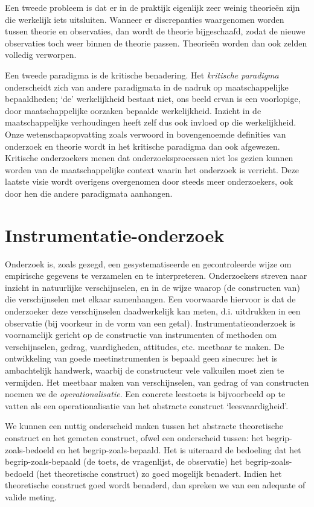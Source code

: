 \documentclass[
]{book}
\begin{document}
Een tweede probleem is dat er in de praktijk eigenlijk zeer weinig
theorieën zijn die werkelijk iets uitsluiten. Wanneer er discrepanties
waargenomen worden tussen theorie en observaties, dan wordt de theorie
bijgeschaafd, zodat de nieuwe observaties toch weer binnen de theorie
passen. Theorieën worden dan ook zelden volledig verworpen.

Een tweede paradigma is de kritische benadering. Het \emph{kritische paradigma}
onderscheidt zich van andere paradigmata in de nadruk op
maatschappelijke bepaaldheden; `de' werkelijkheid bestaat niet, ons
beeld ervan is een voorlopige, door maatschappelijke oorzaken bepaalde
werkelijkheid. Inzicht in de maatschappelijke verhoudingen heeft zelf
dus ook invloed op die werkelijkheid. Onze wetenschapsopvatting zoals
verwoord in bovengenoemde definities van onderzoek en theorie wordt in
het kritische paradigma dan ook afgewezen. Kritische onderzoekers menen
dat onderzoeksprocessen niet los gezien kunnen worden van de
maatschappelijke context waarin het onderzoek is verricht. Deze laatste
visie wordt overigens overgenomen door steeds meer onderzoekers, ook
door hen die andere paradigmata aanhangen.

\hypertarget{sec:instrumentatie-onderzoek}{%
\section{Instrumentatie-onderzoek}\label{sec:instrumentatie-onderzoek}}

Onderzoek is, zoals gezegd, een gesystematiseerde en gecontroleerde
wijze om empirische gegevens te verzamelen en te interpreteren.
Onderzoekers streven naar inzicht in natuurlijke verschijnselen, en in
de wijze waarop (de constructen van) die verschijnselen met elkaar
samenhangen. Een voorwaarde hiervoor is dat de onderzoeker deze
verschijnselen daadwerkelijk kan meten, d.i. uitdrukken in een
observatie (bij voorkeur in de vorm van een getal).
Instrumentatieonderzoek is voornamelijk gericht op de constructie van
instrumenten of methoden om verschijnselen, gedrag, vaardigheden,
attitudes, etc. meetbaar te maken. De ontwikkeling van goede
meetinstrumenten is bepaald geen sinecure: het is ambachtelijk handwerk,
waarbij de constructeur vele valkuilen moet zien te vermijden. Het
meetbaar maken van verschijnselen, van gedrag of van constructen noemen
we de \emph{operationalisatie}. Een concrete leestoets is bijvoorbeeld op te
vatten als een operationalisatie van het abstracte construct
`leesvaardigheid'.

We kunnen een nuttig onderscheid maken tussen het abstracte theoretische
construct en het gemeten construct, ofwel een onderscheid tussen: het
begrip-zoals-bedoeld en het begrip-zoals-bepaald. Het is uiteraard de
bedoeling dat het begrip-zoals-bepaald (de toets, de vragenlijst, de
observatie) het begrip-zoals-bedoeld (het theoretische construct) zo
goed mogelijk benadert. Indien het theoretische construct goed wordt
benaderd, dan spreken we van een adequate of valide meting.
\end{document}
